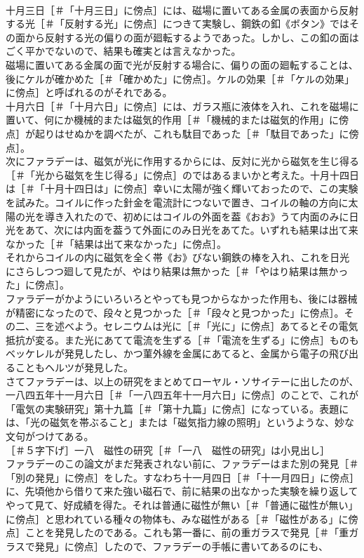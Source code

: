 \documentclass[8pt]{extreport}
\begin{document}
\begin{CJK}{UTF8}{min}
\\	十月三日［＃「十月三日」に傍点］には、磁場に置いてある金属の表面から反射する光［＃「反射する光」に傍点］につきて実験し、鋼鉄の釦《ボタン》ではその面から反射する光の偏りの面が廻転するようであった。しかし、この釦の面はごく平かでないので、結果も確実とは言えなかった。
\\	磁場に置いてある金属の面で光が反射する場合に、偏りの面の廻転することは、後にケルが確かめた［＃「確かめた」に傍点］。ケルの効果［＃「ケルの効果」に傍点］と呼ばれるのがそれである。
\\	十月六日［＃「十月六日」に傍点］には、ガラス瓶に液体を入れ、これを磁場に置いて、何にか機械的または磁気的作用［＃「機械的または磁気的作用」に傍点］が起りはせぬかを調べたが、これも駄目であった［＃「駄目であった」に傍点］。
\\	次にファラデーは、磁気が光に作用するからには、反対に光から磁気を生じ得る［＃「光から磁気を生じ得る」に傍点］のではあるまいかと考えた。十月十四日は［＃「十月十四日は」に傍点］幸いに太陽が強く輝いておったので、この実験を試みた。コイルに作った針金を電流計につないで置き、コイルの軸の方向に太陽の光を導き入れたので、初めにはコイルの外面を葢《おお》うて内面のみに日光をあて、次には内面を葢うて外面にのみ日光をあてた。いずれも結果は出て来なかった［＃「結果は出て来なかった」に傍点］。
\\	それからコイルの内に磁気を全く帯《お》びない鋼鉄の棒を入れ、これを日光にさらしつつ廻して見たが、やはり結果は無かった［＃「やはり結果は無かった」に傍点］。
\\	ファラデーがかようにいろいろとやっても見つからなかった作用も、後には器械が精密になったので、段々と見つかった［＃「段々と見つかった」に傍点］。その二、三を述べよう。セレニウムは光に［＃「光に」に傍点］あてるとその電気抵抗が変る。また光にあてて電流を生ずる［＃「電流を生ずる」に傍点］ものもベッケレルが発見したし、かつ菫外線を金属にあてると、金属から電子の飛び出ることもヘルツが発見した。
\\	さてファラデーは、以上の研究をまとめてローヤル・ソサイテーに出したのが、一八四五年十一月六日［＃「一八四五年十一月六日」に傍点］のことで、これが「電気の実験研究」第十九篇［＃「第十九篇」に傍点］になっている。表題には、「光の磁気を帯ぶること」または「磁気指力線の照明」というような、妙な文句がつけてある。
\\	［＃５字下げ］一八　磁性の研究［＃「一八　磁性の研究」は小見出し］
\\	ファラデーのこの論文がまだ発表されない前に、ファラデーはまた別の発見［＃「別の発見」に傍点］をした。すなわち十一月四日［＃「十一月四日」に傍点］に、先頃他から借りて来た強い磁石で、前に結果の出なかった実験を繰り返してやって見て、好成績を得た。それは普通に磁性が無い［＃「普通に磁性が無い」に傍点］と思われている種々の物体も、みな磁性がある［＃「磁性がある」に傍点］ことを発見したのである。これも第一番に、前の重ガラスで発見［＃「重ガラスで発見」に傍点］したので、ファラデーの手帳に書いてあるのにも、

\end{CJK}
\end{document}
